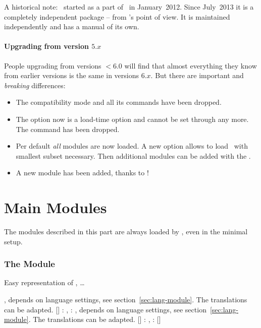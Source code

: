 \documentclass{chemmacros-manual}
\begin{document}
A historical note: \chemformula\ started as a part of \chemmacros\ in
January~2012.  Since July~2013 it is a completely independent package -- from
\chemformula's point of view.  It is maintained independently and has a manual
of its own.

\subsection{Upgrading from version $5.x$}
People upgrading from versions $<6.0$ will find that almost everything they
know from earlier versions is the same in versions $6.x$.  But there are
important and \emph{breaking} differences:
\begin{itemize}
  \item The compatibility mode and all its commands have been dropped.
  \item The option  now is a load-time option and cannot be
    set through  any more.  The command  has
    been dropped.
  \item Per default \emph{all} modules are now loaded.  A new option
     allows to load \chemmacros\ with smallest subset
    necessary. Then additional modules can be added with the
    .
  \item A new module  has been added, thanks to \leandriis!
\end{itemize}

\part{Main Modules}\label{part:main-modules}

The modules described in this part are always loaded by \chemmacros, even in
the minimal setup.

\section{The  Module}\label{sec:acid-base-module}

Easy representation of \pH, \pKa \ldots
\begin{commands}
   \pH
   \pOH
   \Ka, depends on language settings, see
    section~\vref{sec:lang-module}.  The translations can be adapted.
   \Kb
   \Kw
  [] : \pKa, : \pKa[1], depends
    on language settings, see  section~\vref{sec:lang-module}.  The translations
    can be adapted.
  [] : \pKb, : \pKb[1]
  [] \eg\  \p{\Kw}
\end{commands}
\end{document}
